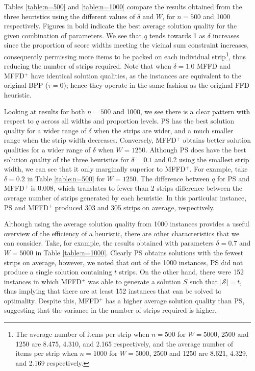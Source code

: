 \documentclass[runningheads]{llncs}
\begin{document}
\noindent Tables \ref{table:n=500} and \ref{table:n=1000} compare the results obtained from the three heuristics using the different values of $\delta$ and $W$, for $n = 500$ and 1000 respectively. Figures in bold indicate the best average solution quality for the given combination of parameters. We see that $q$ tends towards 1 as $\delta$ increases since the proportion of score widths meeting the vicinal sum constraint increases, consequently permissing more items to be packed on each individual strip\footnote{The average number of items per strip when $n = 500$ for $W = 5000$, 2500 and 1250 are 8.475, 4.310, and 2.165 respectively, and the average number of items per strip when $n = 1000$ for $W = 5000$, 2500 and 1250 are 8.621, 4.329, and 2.169 respectively.}, thus reducing the number of strips required. Note that when $\delta = 1.0$ MFFD and MFFD$^+$ have identical solution qualities, as the instances are equivalent to the original BPP ($\tau = 0$); hence they operate in the same fashion as the original FFD heuristic.

Looking at results for both $n = 500$ and 1000, we see there is a clear pattern with respect to $q$ across all widths and proportion levels. PS has the best solution quality for a wider range of $\delta$ when the strips are wider, and a much smaller range when the strip width decreases. Conversely, MFFD$^+$ obtains better solution qualities for a wider range of $\delta$ when $W = 1250$. Although PS does have the best solution quality of the three heuristics for $\delta = 0.1$ and 0.2 using the smallest strip width, we can see that it only marginally superior to MFFD$^+$. For example, take $\delta = 0.2$ in Table \ref{table:n=500} for $W = 1250$. The difference between $q$ for PS and MFFD$^+$ is 0.008, which translates to fewer than 2 strips difference between the average number of strips generated by each heuristic. In this particular instance, PS and MFFD$^+$ produced 303 and 305 strips on average, respectively.

Although using the average solution quality from 1000 instances provides a useful overview of the efficiency of a heuristic, there are other characteristics that we can consider. Take, for example, the results obtained with parameters $\delta = 0.7$ and $W = 5000$ in Table \ref{table:n=1000}. Clearly PS obtains solutions with the fewest strips on average, however, we noted that out of the 1000 instances, PS did not produce a single solution containing $t$ strips. On the other hand, there were 152 instances in which MFFD$^+$ was able to generate a solution $S$ such that $|\mathcal{S}| = t$, thus implying that there are at least 152 instances that can be solved to optimality. Despite this, MFFD$^+$ has a higher average solution quality than PS, suggesting that the variance in the number of strips required is higher.
\end{document}
